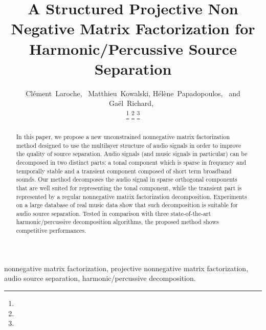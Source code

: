 \documentclass[journal]{IEEEtran}
\begin{document}
\title{A Structured Projective Non Negative Matrix Factorization for Harmonic/Percussive Source Separation}

\author{Cl\'{e}ment~Laroche,~
        Matthieu~Kowalski,
        H\'{e}l\`{e}ne~Papadopoulos,~
        and Ga\"{el}~Richard,~%
        
\thanks{}%
\thanks{}%
\thanks{}}



\maketitle


\begin{abstract}
In this paper, we propose a new unconstrained nonnegative matrix factorization method designed to use the multilayer structure of audio signals in order to improve the quality of source separation. Audio signals (and music signals in particular) can be decomposed in two distinct parts: a tonal component which is sparse in frequency and temporally stable and a transient component composed of short term broadband sounds. Our method decomposes the audio signal in sparse orthogonal components that are well suited for representing the tonal component, while the transient part is represented by a regular nonnegative matrix factorization decomposition. Experiments on a large database of real music data show that such decomposition is suitable for audio source separation. Tested in comparison with three state-of-the-art harmonic/percussive decomposition algorithms, the proposed method shows competitive performances.
\end{abstract}


\begin{IEEEkeywords}
nonnegative matrix factorization, projective nonnegative matrix factorization, audio source separation, harmonic/percussive decomposition.
\end{IEEEkeywords}















\end{document}
